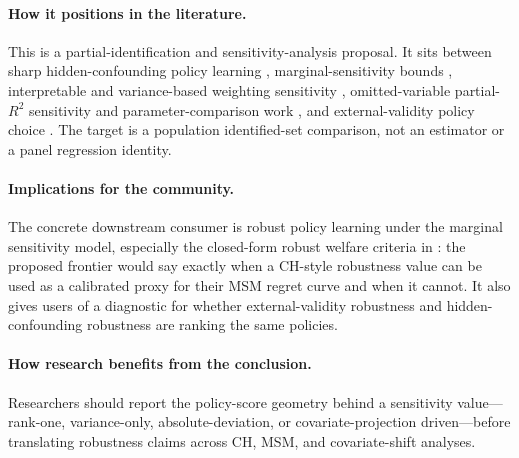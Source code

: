 \documentclass[11pt]{article}
\theoremstyle{definition}
\theoremstyle{plain}
\theoremstyle{remark}
\begin{document}
\paragraph{How it positions in the literature.}
This is a partial-identification and sensitivity-analysis proposal.  It sits between sharp hidden-confounding policy learning \citep{KallusZhou2021,JinXuZhengZhou2025}, marginal-sensitivity bounds \citep{ZhaoSmallBhattacharya2019,YadlowskyNamkoongBasuDuchiTian2022,DornGuoKallus2025,MastenPoirierRen2025}, interpretable and variance-based weighting sensitivity \citep{SorianoBenMichaelBickelFellerPimentel2023,HuangPimentel2025}, omitted-variable partial-$R^2$ sensitivity and parameter-comparison work \citep{CinelliHazlett2020,DiegertMastenPoirier2025}, and external-validity policy choice \citep{AdjahoChristensen2025,ChristensenConnault2023}.  The target is a population identified-set comparison, not an estimator or a panel regression identity.

\paragraph{Implications for the community.}
The concrete downstream consumer is robust policy learning under the marginal sensitivity model, especially the closed-form robust welfare criteria in \citet{JinXuZhengZhou2025}: the proposed frontier would say exactly when a CH-style robustness value can be used as a calibrated proxy for their MSM regret curve and when it cannot.  It also gives users of \citet{AdjahoChristensen2025} a diagnostic for whether external-validity robustness and hidden-confounding robustness are ranking the same policies.

\paragraph{How research benefits from the conclusion.}
Researchers should report the policy-score geometry behind a sensitivity value---rank-one, variance-only, absolute-deviation, or covariate-projection driven---before translating robustness claims across CH, MSM, and covariate-shift analyses.
\end{document}
